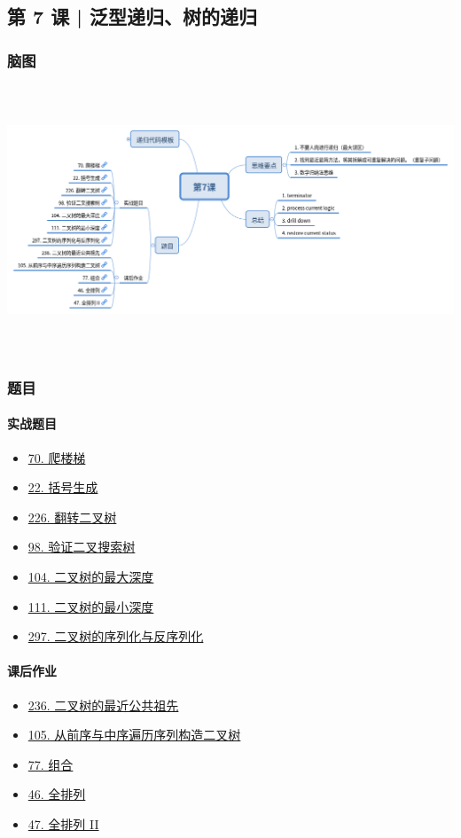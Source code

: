 \subsection{第 7 课 | 泛型递归、树的递归}

\subsubsection{脑图}

\includegraphics[width=170mm,height=80mm]{images/camp/第7课.png}

\subsubsection{题目}

\paragraph{实战题目}

\begin{itemize}
  \item \hyperref[leetcode:70]{70. 爬楼梯}
  \item \hyperref[leetcode:22]{22. 括号生成}
  \item \hyperref[leetcode:226]{226. 翻转二叉树}
  \item \hyperref[leetcode:98]{98. 验证二叉搜索树}
  \item \hyperref[leetcode:104]{104. 二叉树的最大深度}
  \item \hyperref[leetcode:111]{111. 二叉树的最小深度}
  \item \hyperref[leetcode:297]{297. 二叉树的序列化与反序列化}
\end{itemize}

\paragraph{课后作业}

\begin{itemize}
  \item \hyperref[leetcode:236]{236. 二叉树的最近公共祖先}
  \item \hyperref[leetcode:105]{105. 从前序与中序遍历序列构造二叉树}
  \item \hyperref[leetcode:77]{77. 组合}
  \item \hyperref[leetcode:46]{46. 全排列}
  \item \hyperref[leetcode:47]{47. 全排列 II}
\end{itemize}
